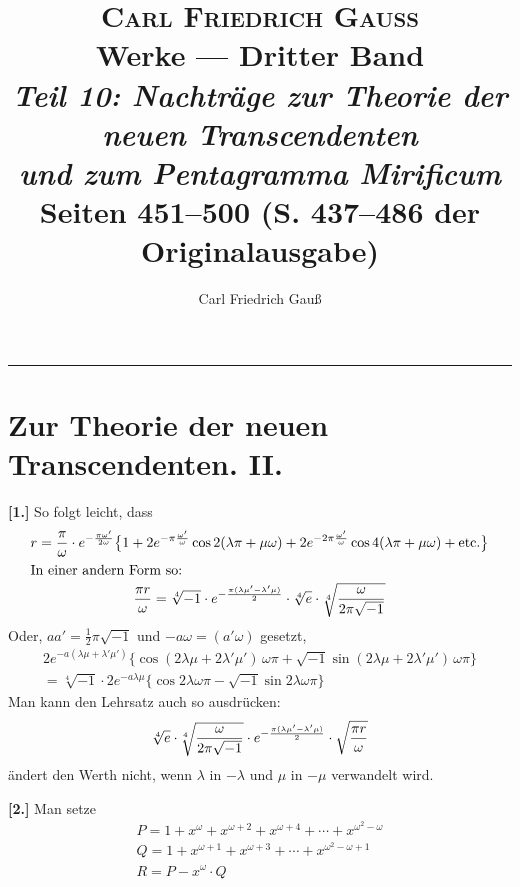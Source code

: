 \documentclass[10pt,a4paper]{article}
\title{\vspace{-1cm}\Large\textsc{Carl Friedrich Gauß}\\[.5em]
\LARGE\textbf{Werke — Dritter Band}\\[.3em]
\large\textit{Teil 10: Nachträge zur Theorie der neuen Transcendenten\\
und zum Pentagramma Mirificum}\\[.5em]
\normalsize Seiten 451--500 (S. 437--486 der Originalausgabe)}
\author{Carl Friedrich Gauß}
\date{}
\begin{document}
\maketitle
\thispagestyle{empty}

\vspace{1em}
\begin{center}
\rule{0.6\textwidth}{0.4pt}
\end{center}
\vspace{1em}

\section*{Zur Theorie der neuen Transcendenten. II.}

\textbf{[1.]} So folgt leicht, dass
%
\begin{gather*}
r = \frac{\pi}{\omega} \cdot e^{-\frac{\pi\omega'}{2\omega}} \bigl\{1 + 2e^{-\pi\frac{\omega'}{\omega}} \cos 2(\lambda\pi + \mu\omega) + 2e^{-2\pi\frac{\omega'}{\omega}} \cos 4(\lambda\pi + \mu\omega) + \text{etc.}\bigr\} \\
\intertext{In einer andern Form so:}
\frac{\pi r}{\omega} = \sqrt[4]{-1} \cdot e^{-\frac{\pi(\lambda\mu' - \lambda'\mu)}{2}} \cdot \sqrt[4]{e} \cdot \sqrt[4]{\frac{\omega}{2\pi\sqrt{-1}}}
\end{gather*}
%
Oder, $aa' = \frac{1}{2}\pi\sqrt{-1}$ und $-a\omega = (a'\omega)$ gesetzt,
%
\begin{multline*}
2e^{-a(\lambda\mu + \lambda'\mu')} \bigl\{\cos(2\lambda\mu + 2\lambda'\mu')\, \omega\pi + \sqrt{-1}\sin(2\lambda\mu + 2\lambda'\mu')\, \omega\pi\bigr\} \\
= \sqrt[4]{-1} \cdot 2e^{-a\lambda\mu} \bigl\{\cos 2\lambda\omega\pi - \sqrt{-1}\sin 2\lambda\omega\pi\bigr\}
\end{multline*}
%
Man kann den Lehrsatz auch so ausdrücken:
%
\begin{equation*}
\sqrt[4]{e} \cdot \sqrt[\leftroot{2}\uproot{2}4]{\frac{\omega}{2\pi\sqrt{-1}}} \cdot e^{-\frac{\pi(\lambda\mu' - \lambda'\mu)}{2}} \cdot \sqrt{\frac{\pi r}{\omega}}
\end{equation*}
ändert den Werth nicht, wenn $\lambda$ in $-\lambda$ und $\mu$ in $-\mu$ verwandelt wird.

\textbf{[2.]} Man setze
%
\begin{gather*}
P = 1 + x^{\omega} + x^{\omega+2} + x^{\omega+4} + \cdots + x^{\omega^2 - \omega} \\
Q = 1 + x^{\omega+1} + x^{\omega+3} + \cdots + x^{\omega^2 - \omega + 1} \\
R = P - x^{\omega} \cdot Q
\end{gather*}
\end{document}
